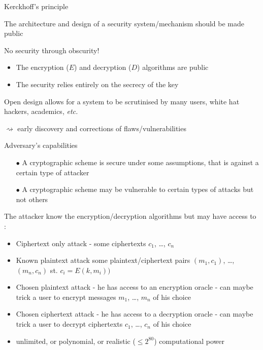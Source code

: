 \documentclass[aspectratio=169, lualatex, handout, 10pt,dvipsnames,svgnames]{beamer} %
\newcommand{\Inblue}[1]{\textcolor{bleu}{#1}}
\def\enrouge#1{\textcolor{rouge}{#1}}
\begin{document}
\begin{frame}{Kerckhoff's principle}

  The architecture and design of a security system/mechanism should be made public
  \bigskip
  
  \begin{alertblock}{No security through obscurity!}
    \begin{itemize}
    \item The encryption ($E$) and decryption ($D$) algorithms are public
    \item The security relies entirely on the secrecy of the key
    \end{itemize}
  \end{alertblock}
  \bigskip

  Open design allows for a system to be scrutinised by many users, white hat hackers, academics, \emph{etc.}

  \enrouge{$\rightsquigarrow$} early discovery and corrections of flaws/vulnerabilities  
\end{frame}

\begin{frame}{Adversary's capabilities}
  \vspace{-0.5cm}
  \begin{alertblock}{}
    \begin{itemize}
    \item[$\bullet$] A cryptographic scheme is secure under some assumptions, that is against a certain type of attacker
    \item[$\bullet$] A cryptographic scheme may be vulnerable to certain types of attacks but not others
    \end{itemize}
  \end{alertblock}
  \medskip
  \pause
  
  The attacker know the encryption/decryption algorithms but may have access to :
  \begin{itemize}
  \item \Inblue{Ciphertext only attack} - some ciphertexts $c_1$, \ldots, $c_n$
    \medskip
    
  \item \Inblue{Known plaintext attack} some plaintext/ciphertext pairs $(m_1, c_1)$, \ldots, $(m_n, c_n)$ st. $c_i = E(k, m_i))$
    \medskip
    
  \item \Inblue{Chosen plaintext attack} - he has access to an encryption oracle - can maybe trick a user to encrypt messages $m_1$, \dots, $m_n$ of his choice
    \medskip

  \item \Inblue{Chosen ciphertext attack} - he has access to a decryption oracle - can maybe trick a user to decrypt ciphertexts $c_1$, \dots, $c_n$ of his choice
    \medskip

  \item unlimited, or polynomial, or realistic ($\le 2^{80}$) \Inblue{computational power}

  \end{itemize}

\end{frame}
\end{document}
